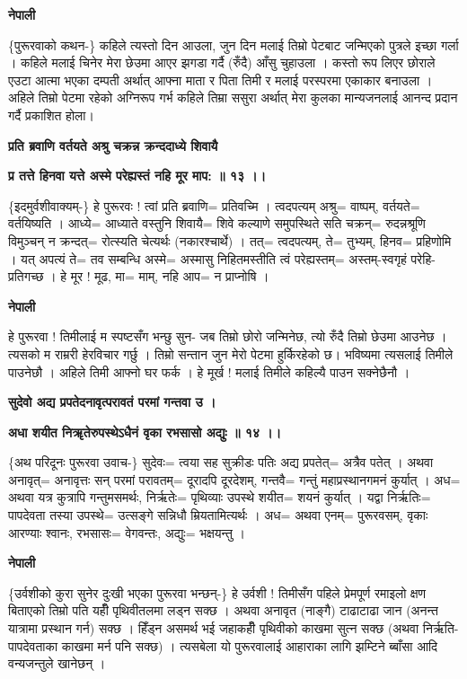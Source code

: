 \documentclass[11pt, a5paper]{article}
\begin{document}
\textbf{नेपाली}

\{पुरूरवाको कथन-\} कहिले त्यस्तो दिन आउला, जुन दिन मलाई तिम्रो पेटबाट जन्मिएको पुत्रले इच्छा गर्ला । कहिले मलाई चिनेर मेरा छेउमा आएर झगडा गर्दै (रुँदै) आँसु चुहाउला । कस्तो रूप लिएर छोराले एउटा आत्मा भएका दम्पती अर्थात् आफ्ना माता र पिता तिमी र मलाई परस्परमा एकाकार बनाउला । अहिले तिम्रो पेटमा रहेको अग्निरूप गर्भ कहिले तिम्रा ससुरा अर्थात् मेरा कुलका मान्यजनलाई आनन्द प्रदान गर्दै प्रकाशित होला।

\textbf{प्रति ब्रवाणि वर्तयते अश्रु चक्रन्न क्रन्ददाध्ये शिवायै}

\textbf{प्र तत्ते हिनवा यत्ते अस्मे परेह्यस्तं नहि मूर माप: ॥ १३ ।।}

\{इदमुर्वशीवाक्यम्-\} हे पुरूरवः ! त्वां प्रति ब्रवाणि= प्रतिवच्मि । त्वदपत्यम् अश्रु= वाष्पम्, वर्तयते= वर्तयिष्यति । आध्ये= आध्याते वस्तुनि शिवायै= शिवे कल्याणे समुपस्थिते सति चक्रन्= रुदन्नश्रूणि विमुञ्चन् न क्रन्दत्= रोत्स्यति चेत्यर्थः (नकारश्चार्थे) । तत्= त्वदपत्यम्, ते= तुभ्यम्, हिनव= प्रहिणोमि । यत् अपत्यं ते= तव सम्बन्धि अस्मे= अस्मासु निहितमस्तीति त्वं परेह्यस्तम्= अस्तम्-स्वगृहं परेहि- प्रतिगच्छ । हे मूर ! मूढ, मा= माम्, नहि आप= न प्राप्नोषि ।

\textbf{नेपाली}

हे पुरूरवा ! तिमीलाई म स्पष्टसँग भन्छु सुन- जब तिम्रो छोरो जन्मिनेछ, त्यो रुँदै तिम्रो छेउमा आउनेछ । त्यसको म राम्ररी हेरविचार गर्छु । तिम्रो सन्तान जुन मेरो पेटमा हुर्किरहेको छ। भविष्यमा त्यसलाई तिमीले पाउनेछौ । अहिले तिमी आफ्नो घर फर्क । हे मूर्ख ! मलाई तिमीले कहिल्यै पाउन सक्नेछैनौ ।

\textbf{सुदेवो अद्य प्रपतेदनावृत्परावतं परमां गन्तवा उ ।}

\textbf{अधा शयीत निॠतेरुपस्थेऽधैनं वृका रभसासो अद्युः ॥ १४ ।।}

\{अथ परिदूनः पुरूरवा उवाच-\}   सुदेवः= त्वया सह सुक्रीडः पतिः अद्य प्रपतेत्= अत्रैव पतेत् । अथवा अनावृत्= अनावृत्तः सन् परमां परावतम्= दूरादपि दूरदेशम्, गन्तवै= गन्तुं महाप्रस्थानगमनं कुर्यात् । अध= अथवा यत्र कुत्रापि गन्तुमसमर्थः, निर्ऋतेः= पृथिव्याः उपस्थे शयीत= शयनं कुर्यात् । यद्वा निर्ऋतिः= पापदेवता तस्या उपस्थे= उत्सङ्गे सन्निधौ म्रियतामित्यर्थः । अध= अथवा एनम्= पुरूरवसम्, वृकाः आरण्याः श्वानः, रभसासः= वेगवन्तः, अद्युः= भक्षयन्तु ।

\textbf{नेपाली}

\{उर्वशीको कुरा सुनेर दुःखी भएका पुरूरवा भन्छन्-\}  हे उर्वशी ! तिमीसँग पहिले प्रेमपूर्ण रमाइलो क्षण बिताएको तिम्रो पति यहीँ पृथिवीतलमा लड्न सक्छ । अथवा अनावृत (नाङ्गै) टाढाटाढा जान (अनन्त यात्रामा प्रस्थान गर्न) सक्छ । हिँड्‌न असमर्थ भई जहाकहीँ पृथिवीको काखमा सुत्न सक्छ (अथवा निर्ऋति- पापदेवताका काखमा मर्न पनि सक्छ) । त्यसबेला यो पुरूरवालाई आहाराका लागि झम्टिने ब्बाँसा आदि वन्यजन्तुले खानेछन् ।
\end{document}
